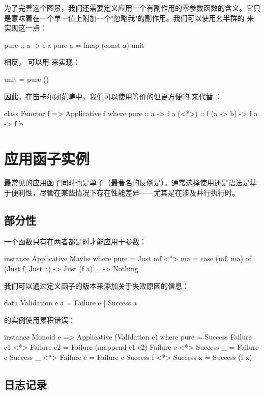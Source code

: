 \documentclass[DaoFP]{subfiles}
\begin{document}
为了完善这个图景，我们还需要定义应用一个有副作用的零参数函数的含义。它只是意味着在一个单一值上附加一个"忽略我"的副作用。我们可以使用幺半群的  来实现这一点：
\begin{haskell}
pure :: a -> f a
pure a = fmap (const a) unit
\end{haskell}
相反， 可以用  来实现：
\begin{haskell}
unit = pure ()
\end{haskell}

因此，在笛卡尔闭范畴中，我们可以使用等价的但更方便的  来代替 ：
\begin{haskell}
class Functor f => Applicative f where
    pure  :: a -> f a
    (<*>) :: f (a -> b) -> f a -> f b
\end{haskell}

\section{应用函子实例}

最常见的应用函子同时也是单子（最著名的反例是）。通常选择使用还是语法是基于便利性，尽管在某些情况下存在性能差异——尤其是在涉及并行执行时。

\subsection{部分性}
一个函数只有在两者都是时才能应用于参数：
\begin{haskell}
instance Applicative Maybe where
  pure = Just
  mf <*> ma = 
    case (mf, ma) of
      (Just f, Just a) -> Just (f a)
      _ -> Nothing
\end{haskell}

我们可以通过定义函子的版本来添加关于失败原因的信息：
\begin{haskell}
data Validation e a = Failure e  | Success a
\end{haskell}
的实例使用累积错误：
\begin{haskell}
instance Monoid e => Applicative (Validation e) where
  pure = Success
  Failure e1 <*> Failure e2 = Failure (mappend e1 e2)
  Failure e  <*> Success _ = Failure e
  Success _  <*> Failure e  = Failure  e
  Success f  <*> Success x  = Success (f x)
\end{haskell}

\subsection{日志记录}
\end{document}
